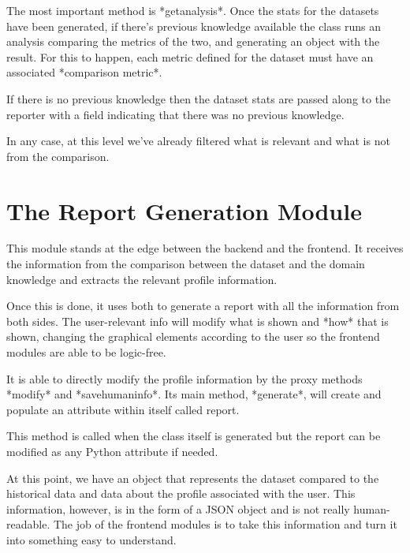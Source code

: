 The most important method is *getanalysis*. Once the stats for the datasets have been generated, if there's previous knowledge available the class runs an analysis comparing the metrics of the two, and generating an object with the result. For this to happen, each metric defined for the dataset must have an associated *comparison metric*.

If there is no previous knowledge then the dataset stats are passed along to the reporter with a field indicating that there was no previous knowledge.

In any case, at this level we've already filtered what is relevant and what is not from the comparison.

\section{The Report Generation Module}
\label{cap2:sec:reporter}

This module stands at the edge between the backend and the frontend. It receives the information from the comparison between the dataset and the domain knowledge and extracts the relevant profile information.

Once this is done, it uses both to generate a report with all the information from both sides. The user-relevant info will modify what is shown and *how* that is shown, changing the graphical elements according to the user so the frontend modules are able to be logic-free.

It is able to directly modify the profile information by the proxy methods *modify* and *savehumaninfo*. Its main method, *generate*, will create and populate an attribute within itself called report.

This method is called when the class itself is generated but the report can be modified as any Python attribute if needed.

At this point, we have an object that represents the dataset compared to the historical data and data about the profile associated with the user. This information, however, is in the form of a JSON object and is not really human-readable. The job of the frontend modules is to take this information and turn it into something easy to understand.


\section*{\NotasBibliograficas}
\TocNotasBibliograficas

